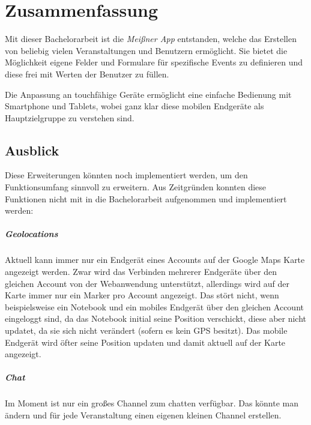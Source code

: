 \chapter{Zusammenfassung}
Mit dieser Bachelorarbeit ist die \emph{Meißner App} entstanden, welche das Erstellen von beliebig vielen Veranstaltungen und Benutzern ermöglicht. Sie bietet die Möglichkeit eigene Felder und Formulare für spezifische Events zu definieren und diese frei mit Werten der Benutzer zu füllen.\par

Die Anpassung an touchfähige Geräte ermöglicht eine einfache Bedienung mit Smartphone und Tablets, wobei ganz klar diese mobilen Endgeräte als Hauptzielgruppe zu verstehen sind.\par




\section{Ausblick}
Diese Erweiterungen könnten noch implementiert werden, um den Funktionsumfang sinnvoll zu erweitern. Aus Zeitgründen konnten diese Funktionen nicht mit in die Bachelorarbeit aufgenommen und implementiert werden:

\paragraph{Geolocations}
Aktuell kann immer nur ein Endgerät eines Accounts auf der Google Maps Karte angezeigt werden. Zwar wird das Verbinden mehrerer Endgeräte über den gleichen Account von der Webanwendung unterstützt, allerdings wird auf der Karte immer nur ein Marker pro Account angezeigt. Das stört nicht, wenn beispielsweise ein Notebook und ein mobiles Endgerät über den gleichen Account eingeloggt sind, da das Notebook initial seine Position verschickt, diese aber nicht updatet, da sie sich nicht verändert (sofern es kein GPS besitzt). Das mobile Endgerät wird öfter seine Position updaten und damit aktuell auf der Karte angezeigt.

\paragraph{Chat}
Im Moment ist nur ein großes Channel zum chatten verfügbar. Das könnte man ändern und für jede Veranstaltung einen eigenen kleinen Channel erstellen.

